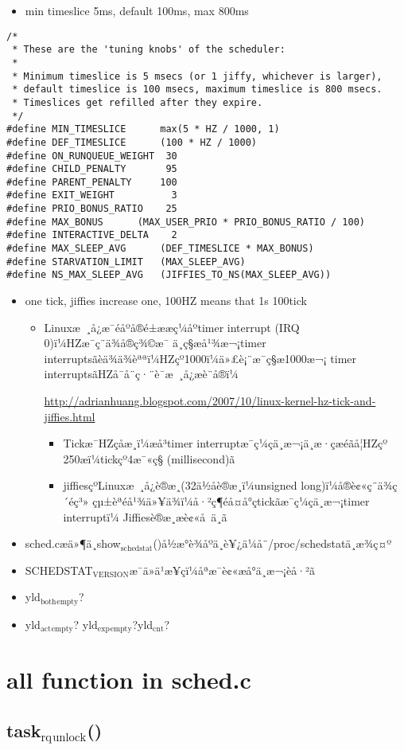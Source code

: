 \documentclass[11pt]{article}
\begin{document}
\begin{itemize}
\item min timeslice 5ms, default 100ms, max 800ms
\end{itemize}
\begin{verbatim}
/*
 * These are the 'tuning knobs' of the scheduler:
 *
 * Minimum timeslice is 5 msecs (or 1 jiffy, whichever is larger),
 * default timeslice is 100 msecs, maximum timeslice is 800 msecs.
 * Timeslices get refilled after they expire.
 */
#define MIN_TIMESLICE      max(5 * HZ / 1000, 1)
#define DEF_TIMESLICE      (100 * HZ / 1000)
#define ON_RUNQUEUE_WEIGHT  30
#define CHILD_PENALTY       95
#define PARENT_PENALTY     100
#define EXIT_WEIGHT          3
#define PRIO_BONUS_RATIO    25
#define MAX_BONUS      (MAX_USER_PRIO * PRIO_BONUS_RATIO / 100)
#define INTERACTIVE_DELTA    2
#define MAX_SLEEP_AVG      (DEF_TIMESLICE * MAX_BONUS)
#define STARVATION_LIMIT   (MAX_SLEEP_AVG)
#define NS_MAX_SLEEP_AVG   (JIFFIES_TO_NS(MAX_SLEEP_AVG))
\end{verbatim}



\begin{itemize}
\item one tick, jiffies increase one, 100HZ means that 1s 100tick

\begin{itemize}
\item Linuxæ ¸å¿æ¯éåºå®é±ææç¼åºtimer interrupt (IRQ 0)ï¼HZæ¯ç¨ä¾å®ç¾©æ¯
    ä¸ç§æå¹¾æ¬¡timer interruptsãèä¾ä¾èªªï¼HZçº1000ï¼ä»£è¡¨æ¯ç§æ1000æ¬¡
    timer interruptsãHZå¯å¨ç·¨è­¯æ ¸å¿æè¨­å®ï¼

    \href{http://adrianhuang.blogspot.com/2007/10/linux-kernel-hz-tick-and-jiffies.html}{http://adrianhuang.blogspot.com/2007/10/linux-kernel-hz-tick-and-jiffies.html}

\begin{itemize}
\item Tickæ¯HZçåæ¸ï¼æå³timer interruptæ¯ç¼çä¸æ¬¡ä¸­æ·çæéãå¦HZçº
     250æï¼tickçº4æ¯«ç§ (millisecond)ã
\item jiffiesçºLinuxæ ¸å¿è®æ¸(32ä½åè®æ¸ï¼unsigned long)ï¼å®è¢«ç¨ä¾ç´éç³»
     çµ±èªéå¹¾ä»¥ä¾ï¼å·²ç¶éå¤å°çtickãæ¯ç¼çä¸æ¬¡timer interruptï¼
     Jiffiesè®æ¸æè¢«å ä¸ã
\end{itemize}

\end{itemize}

\item sched.cæä»¶ä¸­show$_{\mathrm{schedstat}}$()å½æ°è¾åºä¸è¥¿ä¼å¨/proc/schedstatä¸­æ¾ç¤º
\item SCHEDSTAT$_{\mathrm{VERSION}}$æ¯ä»ä¹æ¥çï¼åªæ¯è¢«æå°ä¸æ¬¡èå·²ã
\item yld$_{\mathrm{both}}$$_{\mathrm{empty}}$?
\item yld$_{\mathrm{act}}$$_{\mathrm{empty}}$? yld$_{\mathrm{exp}}$$_{\mathrm{empty}}$?yld$_{\mathrm{cnt}}$?
\end{itemize}
\section{all function in sched.c}
\label{sec-4}

\subsection{task$_{\mathrm{rq}}$$_{\mathrm{unlock}}$()}
\label{sec-4.1}
\end{document}
